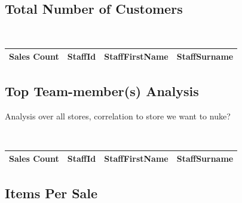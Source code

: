 \documentclass{article}
\begin{document}
            \subsection{Total Number of Customers}

            \begin{lstlisting}
                
            \end{lstlisting}

            \begin{table}[H]
                \centering
                \begin{tabular}{|l|l|l|l|}
                \hline
                Sales Count & StaffId & StaffFirstName & StaffSurname \\ \hline
                \end{tabular}
                \end{table}

            \subsection{Top Team-member(s) Analysis}
                Analysis over all stores, correlation to store we want to nuke?

                \begin{lstlisting}
                   
                \end{lstlisting}

                \begin{table}[H]
                    \centering
                    \begin{tabular}{|l|l|l|l|}
                    \hline
                    Sales Count & StaffId & StaffFirstName & StaffSurname \\ \hline
                    \end{tabular}
                    \end{table}           
                    
            \subsection{Items Per Sale}

            \begin{lstlisting}
                
            \end{lstlisting}
\end{document}
